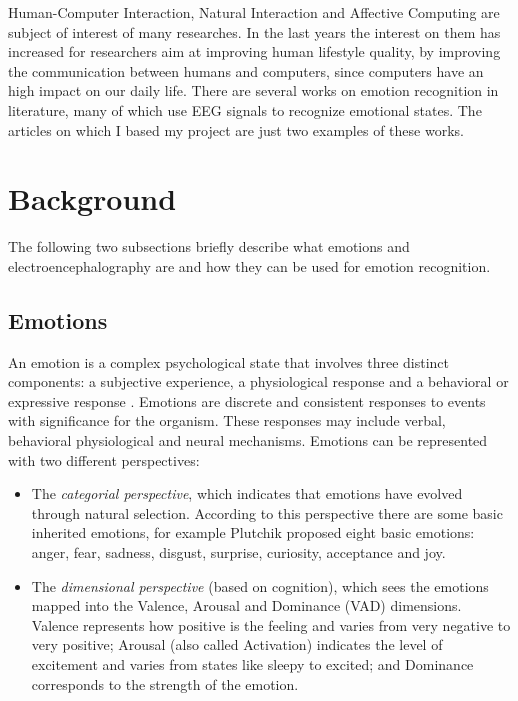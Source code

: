\documentclass[10pt,journal,A4paper,compsoc,epsfig]{IEEEtran}
\begin{document}
Human-Computer Interaction, Natural Interaction and Affective Computing are subject of interest of many researches. In the last years the interest on them has increased for researchers aim at improving human lifestyle quality, by improving the communication between humans and computers, since computers have an high impact on our daily life.
There are several works on emotion recognition in literature, many of which use EEG signals to recognize emotional states. The articles \cite{alarcao2017emotions, zhuang2017emotion} on which I based my project are just two examples of these works.


\section{Background}
The following two subsections briefly describe what emotions and electroencephalography are and how they can be used for emotion recognition.

\label{background}

\subsection{Emotions}
An emotion is a complex psychological state that involves three distinct components: a subjective experience, a physiological response and a behavioral or expressive response \cite{alarcao2017emotions}. Emotions are discrete and consistent responses to events with significance for the organism. These responses may include verbal, behavioral physiological and neural mechanisms.
Emotions can be represented with two different perspectives:
\begin{itemize}
\item The \textit{categorial perspective}, which indicates that emotions have evolved through natural selection. According to this perspective there are some basic inherited emotions, for example Plutchik proposed eight basic emotions: anger, fear, sadness, disgust, surprise, curiosity, acceptance and joy.
\item The \textit{dimensional perspective} (based on cognition), which sees the emotions mapped into the Valence, Arousal and Dominance (VAD) dimensions. Valence represents how positive is the feeling and varies from very negative to very positive; Arousal (also called Activation) indicates the level of excitement and varies from states like sleepy to excited; and Dominance corresponds to the strength of the emotion.
\end{itemize}
\end{document}
